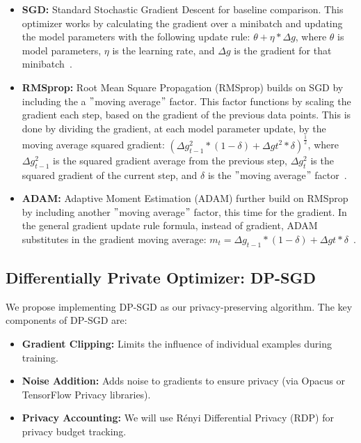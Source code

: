 \documentclass{article}
\begin{document}
    \begin{itemize}
        \item \textbf{SGD:} Standard Stochastic Gradient Descent for baseline comparison.
        This optimizer works by calculating the gradient over a minibatch
        and updating the model parameters with the following update rule: $\theta + \eta * \Delta g$, where $\theta$ is model parameters, $\eta$ is
        the learning rate, and $\Delta g$ is the gradient for that minibatch~\cite{papernot2022hyperparametertuningrenyidifferential}.
        \item \textbf{RMSprop:} Root Mean Square Propagation (RMSprop) builds on SGD by including the a \("\)moving average\("\) factor.
        This factor functions by scaling the gradient
        each step, based on the gradient of the previous data points.
        This is done by dividing the gradient, at each model parameter update,
        by the moving average squared gradient: $(\Delta g_{t-1}^{2} * (1-\delta) + \Delta g{t}^{2}*\delta)^{\frac{1}{2}}$,
        where $\Delta g_{t-1}^{2}$ is the squared gradient average from the previous step, $\Delta g_{t}^{2}$ is
        the squared gradient of the current step, and $\delta$ is the \("\)moving average\("\) factor~\cite{DBLP:journals/corr/abs-1807-06766,Jason_Huang_2020}.
        \item \textbf{ADAM:} Adaptive Moment Estimation (ADAM) further build on RMSprop by including another \("\)moving average\("\) factor, this time for the gradient. In the general gradient update rule formula, instead of gradient,
        ADAM substitutes in the gradient moving average: $m_{t} = \Delta g_{t-1} * (1-\delta) + \Delta g{t}*\delta$~\cite{DBLP:journals/corr/abs-1807-06766}.
    \end{itemize}

    \subsection{Differentially Private Optimizer: DP-SGD}\label{subsec:differentially-private-optimizer:-dp-sgd}
    We propose implementing DP-SGD as our privacy-preserving algorithm.
    The key components of DP-SGD are:
    \begin{itemize}
        \item \textbf{Gradient Clipping:} Limits the influence of individual examples during training.
        \item \textbf{Noise Addition:} Adds noise to gradients to ensure privacy (via Opacus or TensorFlow Privacy libraries).
        \item \textbf{Privacy Accounting:} We will use Rényi Differential Privacy (RDP) for privacy budget tracking.
    \end{itemize}
\end{document}
